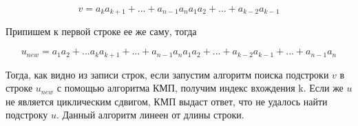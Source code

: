 \documentclass{article}
\begin{document}
\begin{equation}
    v = a_k a_{k + 1} + ... + a_{n - 1} a_n a_1 a_2 + ... + a_{k - 2} a_{k - 1}
\end{equation}

Припишем к первой строке ее же саму, тогда 

\begin{equation}
    u_{new} = a_1 a_2 + ... a_k a_{k + 1} + ... + a_{n - 1} a_n  a_1 a_2 + ... + a_{k - 2} a_{k - 1} + ... + a_{n - 1} a_n
\end{equation}

Тогда, как видно из записи строк, если запустим алгоритм поиска подстроки $v$ в строке $u_{new}$ с помощью алгоритма КМП, получим индекс вхождения k. Если же $u$ не является циклическим сдвигом, КМП выдаст ответ, что не удалось найти подстроку $u$. Данный алгоритм линеен от длины строки.
\end{document}
